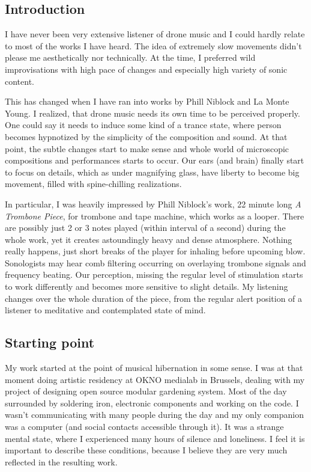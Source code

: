 \documentclass[11pt,a4paper,oneside]{report}
\begin{document}
\subsection{Introduction} I have never been very extensive listener of drone music and I could hardly relate to most of the works I have heard. The idea of extremely slow movements didn't please me aesthetically nor technically. At the time, I preferred wild improvisations with high pace of changes and especially high variety of sonic content.

This has changed when I have ran into works by Phill Niblock and La Monte Young. I realized, that drone music needs its own time to be perceived properly. One could say it needs to induce some kind of a trance state, where person becomes hypnotized by the simplicity of the composition and sound. At that point, the subtle changes start to make sense and whole world of microscopic compositions and performances starts to occur. Our ears (and brain) finally start to focus on details, which as under magnifying glass, have liberty to become big movement, filled with spine-chilling realizations.

In particular, I was heavily impressed by Phill Niblock's work, 22 minute long \emph{A Trombone Piece}, for trombone and tape machine, which works as a looper. There are possibly just 2 or 3 notes played (within interval of a second) during the whole work, yet it creates astoundingly heavy and dense atmosphere. Nothing really happens, just short breaks of the player for inhaling before upcoming blow. Sonologists may hear comb filtering occurring on overlaying trombone signals and frequency beating. Our perception, missing the regular level of stimulation starts to work differently and becomes more sensitive to slight details. My listening changes over the whole duration of the piece, from the regular alert position of a listener to meditative and contemplated state of mind. 

\subsection{Starting point} My work started at the point of musical hibernation in some sense. I was at that moment doing artistic residency at OKNO medialab in Brussels, dealing with my project of designing open source modular gardening system. Most of the day surrounded by soldering iron, electronic components and working on the code. I wasn't communicating with many people during the day and my only companion was a computer (and social contacts accessible through it). It was a strange mental state, where I experienced many hours of silence and loneliness. I feel it is important to describe these conditions, because I believe they are very much reflected in the resulting work. 
\end{document}
